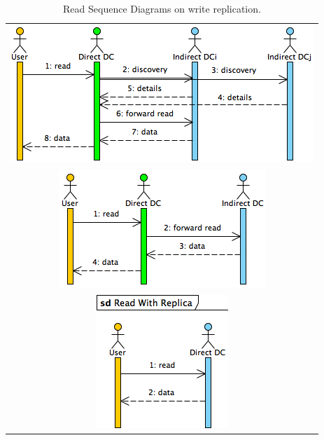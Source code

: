 \documentclass[english]{article}
\begin{document}
\begin{table}[htpb!]
	\begin{center}
		\begin{tabular}{c}
			\includegraphics[width=.96\textwidth]{figures/firstReadWithoutReplica.png} \\
			\includegraphics[width=.7\textwidth]{figures/readWithoutReplica.png} \\
			\includegraphics[width=.45\textwidth]{figures/readWithReplica.png}
		\end{tabular}
		
		\caption{Read Sequence Diagrams on write replication.}
		\label{tb:read_sequence_diagrams}
	\end{center}
\end{table}
\end{document}

